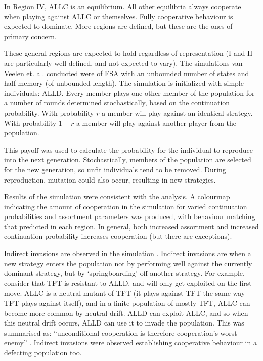 \documentclass[a4paper,11pt,bcshonoursthesis,singlespace,twoside]{cssethesis}
\begin{document}
In Region IV, ALLC is an equilibrium. All other equilibria always cooperate when playing against ALLC or themselves. Fully cooperative behaviour is expected to dominate. More regions are defined, but these are the ones of primary concern.

These general regions are expected to hold regardless of representation (I and II are particularly well defined, and not expected to vary).
The simulations van Veelen et. al. conducted were of FSA with an unbounded number of states and half-memory (of unbounded length). The simulation is initialized with simple individuals: ALLD. Every member plays one other member of the population for a number of rounds determined stochastically, based on the continuation probability. With probability $r$ a member will play against an identical strategy. With probability $1-r$ a member will play against another player from the population. 

This payoff was used to calculate the probability for the individual to reproduce into the next generation. Stochastically, members of the population are selected for the new generation, so unfit individuals tend to be removed. 
During reproduction, mutation could also occur, resulting in new strategies. 

Results of the simulation were consistent with the analysis. 
A colourmap indicating the amount of cooperation in the simulation for varied continuation probabilities and assortment parameters was produced, with behaviour matching that predicted in each region. 
In general, both increased assortment and increased continuation probability increases cooperation (but there are exceptions). 

Indirect invasions are observed in the simulation \citep{garcia:PLoSOne:2012}. 
Indirect invasions are when a new strategy enters the population not by performing well against the currently dominant strategy, but by `springboarding' off another strategy. 
For example, consider that TFT is resistant to ALLD, and will only get exploited on the first move. 
ALLC is a neutral mutant of TFT (it plays against TFT the same way TFT plays against itself), and in a finite population of mostly TFT, ALLC can become more common by neutral drift. 
ALLD can exploit ALLC, and so when this neutral drift occurs, ALLD can use it to invade the population. 
This was summarised as: ``unconditional cooperation is therefore cooperation's worst enemy'' \citep{van-veelen:PNAS:2012}. 
Indirect invasions were observed establishing cooperative behaviour in a defecting population too. 
\end{document}
